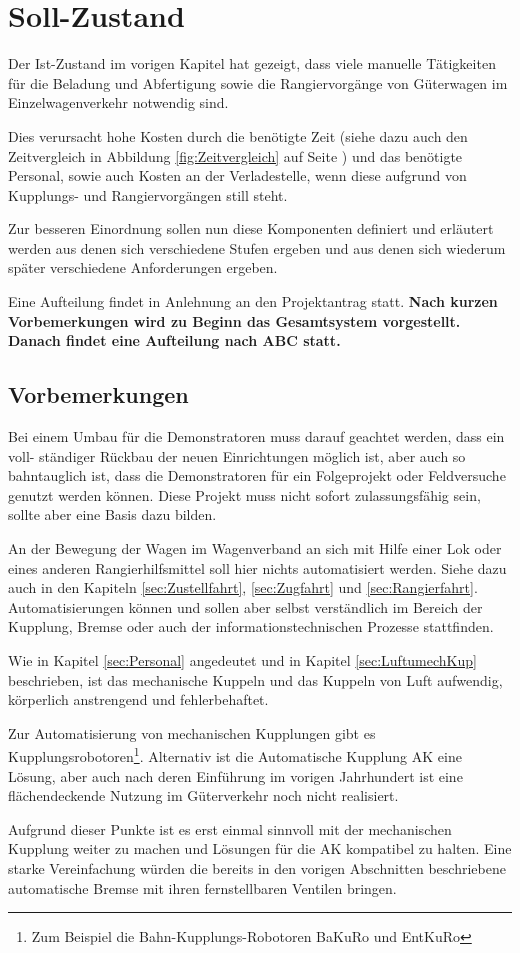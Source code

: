 \section{Soll-Zustand}
Der Ist-Zustand im vorigen Kapitel hat gezeigt, dass viele manuelle Tätigkeiten für die Beladung und Abfertigung sowie die Rangiervorgänge von Güterwagen im Einzelwagenverkehr notwendig sind.\par
Dies verursacht hohe Kosten durch die benötigte Zeit (siehe dazu auch den Zeitvergleich in Abbildung \ref{fig:Zeitvergleich} auf Seite \pageref{fig:Zeitvergleich}) und das benötigte Personal, sowie auch Kosten an der Verladestelle, wenn diese aufgrund von Kupplungs- und Rangiervorgängen still steht.\par
Zur besseren Einordnung sollen nun diese Komponenten definiert und erläutert werden aus denen sich verschiedene Stufen ergeben und aus denen sich wiederum später verschiedene Anforderungen ergeben.\par
Eine Aufteilung findet in Anlehnung an den Projektantrag statt. \textbf{Nach kurzen Vorbemerkungen wird zu Beginn das Gesamtsystem vorgestellt. Danach findet eine Aufteilung nach ABC statt.}
\subsection{Vorbemerkungen}
Bei einem Umbau für die Demonstratoren muss darauf geachtet werden, dass ein voll- ständiger Rückbau der neuen Einrichtungen möglich ist, aber auch so bahntauglich ist, dass die Demonstratoren für ein Folgeprojekt oder Feldversuche genutzt werden können. Diese Projekt muss nicht sofort zulassungsfähig sein, sollte aber eine Basis dazu bilden. \par
An der Bewegung der Wagen im Wagenverband an sich mit Hilfe einer Lok oder eines anderen Rangierhilfsmittel soll hier nichts automatisiert werden. Siehe dazu auch in den Kapiteln \ref{sec:Zustellfahrt}, \ref{sec:Zugfahrt} und \ref{sec:Rangierfahrt}. Automatisierungen können und sollen aber selbst verständlich im Bereich der Kupplung, Bremse oder auch der informationstechnischen Prozesse stattfinden.\par
Wie in Kapitel \ref{sec:Personal} angedeutet und in Kapitel \ref{sec:LuftumechKup} beschrieben, ist das mechanische Kuppeln und das Kuppeln von Luft aufwendig, körperlich anstrengend und fehlerbehaftet. \par
Zur Automatisierung von mechanischen Kupplungen gibt es Kupplungsrobotoren\footnote{Zum Beispiel die Bahn-Kupplungs-Robotoren BaKuRo und EntKuRo}. Alternativ ist die Automatische Kupplung \acrshort{AK} eine Lösung, aber auch nach deren Einführung im vorigen Jahrhundert ist eine flächendeckende Nutzung im Güterverkehr noch nicht realisiert.\par
Aufgrund dieser Punkte ist es erst einmal sinnvoll mit der mechanischen Kupplung weiter zu machen und Lösungen für die \acrshort{AK} kompatibel zu halten. Eine starke Vereinfachung würden die bereits in den vorigen Abschnitten beschriebene automatische Bremse mit ihren fernstellbaren Ventilen bringen.

